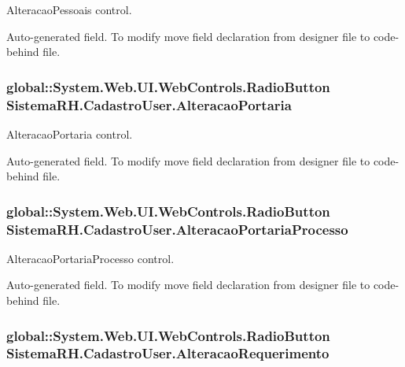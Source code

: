 AlteracaoPessoais control. 

Auto-\/generated field. To modify move field declaration from designer file to code-\/behind file. \hypertarget{class_sistema_r_h_1_1_cadastro_user_a2095d4e90a9bedd977437adbac8c3c08}{
\subsubsection[{AlteracaoPortaria}]{\setlength{\rightskip}{0pt plus 5cm}global::System.Web.UI.WebControls.RadioButton {\bf SistemaRH.CadastroUser.AlteracaoPortaria}}}
\label{class_sistema_r_h_1_1_cadastro_user_a2095d4e90a9bedd977437adbac8c3c08}


AlteracaoPortaria control. 

Auto-\/generated field. To modify move field declaration from designer file to code-\/behind file. \hypertarget{class_sistema_r_h_1_1_cadastro_user_add7a4033b512309e1db5f806a68d2c9a}{
\subsubsection[{AlteracaoPortariaProcesso}]{\setlength{\rightskip}{0pt plus 5cm}global::System.Web.UI.WebControls.RadioButton {\bf SistemaRH.CadastroUser.AlteracaoPortariaProcesso}}}
\label{class_sistema_r_h_1_1_cadastro_user_add7a4033b512309e1db5f806a68d2c9a}


AlteracaoPortariaProcesso control. 

Auto-\/generated field. To modify move field declaration from designer file to code-\/behind file. \hypertarget{class_sistema_r_h_1_1_cadastro_user_a9ede310987a21320038bf58b3938345e}{
\subsubsection[{AlteracaoRequerimento}]{\setlength{\rightskip}{0pt plus 5cm}global::System.Web.UI.WebControls.RadioButton {\bf SistemaRH.CadastroUser.AlteracaoRequerimento}}}
\label{class_sistema_r_h_1_1_cadastro_user_a9ede310987a21320038bf58b3938345e}


